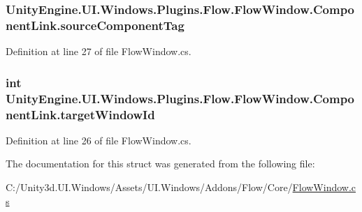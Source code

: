 \subsubsection[{source\+Component\+Tag}]{ Unity\+Engine.\+U\+I.\+Windows.\+Plugins.\+Flow.\+Flow\+Window.\+Component\+Link.\+source\+Component\+Tag}\label{struct_unity_engine_1_1_u_i_1_1_windows_1_1_plugins_1_1_flow_1_1_flow_window_1_1_component_link_a588dcfaf5fb56f0cc997c45d474aab70}


Definition at line 27 of file Flow\+Window.\+cs.

\hypertarget{struct_unity_engine_1_1_u_i_1_1_windows_1_1_plugins_1_1_flow_1_1_flow_window_1_1_component_link_a6c6892eee3f4494f907240b19b07430e}{}
\subsubsection[{target\+Window\+Id}]{\setlength{\rightskip}{0pt plus 5cm}int Unity\+Engine.\+U\+I.\+Windows.\+Plugins.\+Flow.\+Flow\+Window.\+Component\+Link.\+target\+Window\+Id}\label{struct_unity_engine_1_1_u_i_1_1_windows_1_1_plugins_1_1_flow_1_1_flow_window_1_1_component_link_a6c6892eee3f4494f907240b19b07430e}


Definition at line 26 of file Flow\+Window.\+cs.



The documentation for this struct was generated from the following file\+:\begin{DoxyCompactItemize}
\item 
C\+:/\+Unity3d.\+U\+I.\+Windows/\+Assets/\+U\+I.\+Windows/\+Addons/\+Flow/\+Core/\hyperlink{_flow_window_8cs}{Flow\+Window.\+cs}\end{DoxyCompactItemize}
